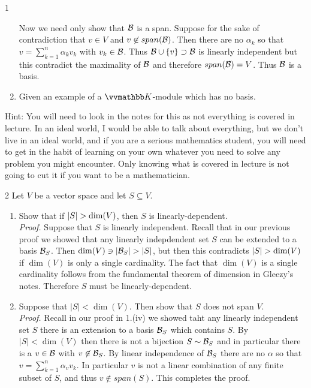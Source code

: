 \documentclass{exercises}
\begin{document}
\begin{exr}{}{1}
\begin{enumerate}
			Now we need only show that $\scriptb$ is a span. Suppose for the sake of contradiction that $v \in V$ and $v \not \in span(\scriptb)$. Then there are no $\alpha_k$ so that $v = \sum_{k=1}^n \alpha_k v_k$ with $v_k \in \scriptb$. Thus $\scriptb \cup \{v\} \supset \scriptb$ is linearly independent but this contradict the maximality of $\scriptb$ and therefore $span(\scriptb) = V$. Thus $\scriptb$ is a basis.

		\item Given an example of a $\K$-module which has no basis.
	\end{enumerate}
	\begin{rmk}
		Hint:  You will need to look in the notes for this as not everything is covered in lecture.  In an ideal world, I would be able to talk about everything, but we don't live in an ideal world, and if you are a serious mathematics student, you will need to get in the habit of learning on your own whatever you need to solve any problem you might encounter.  Only knowing what is covered in lecture is not going to cut it if you want to be a mathematician.
	\end{rmk}
\end{exr}



\begin{exr}{}{2}
	Let $V$ be a vector space and let $S\subseteq V$.
	\begin{enumerate}
		\item Show that if $\lvert S\rvert>\dim (V)$, then $S$ is linearly-dependent.\\

		\emph{Proof.} Suppose that $S$ is linearly independent. Recall that in our previous proof we showed that  any linearly indepdendent set $S$ can be extended to a basis $\scriptb_S$. Then $\dim(V) \ni |\scriptb_S| > |S|$, but then this contradicts $\lvert S\rvert > \dim(V)$ if $\dim(V)$ is only a single cardinality. The fact that $\dim(V)$ is a single cardinality follows from the fundamental theorem of dimension in Gleezy's notes. Therefore $S$ must be linearly-dependent.

		\item Suppose that $|S| < \dim (V)$. Then show that $S$ does not span $V$.\\

		\emph{Proof.} Recall in our proof in 1.(iv) we showed taht any linearly independent set $S$ there is an extension to a basis $\scriptb_S$ which contains $S$. By $|S| < \dim (V)$ then there is not a bijection $S \sim \scriptb_S$ and in particular there is a $v \in \scriptb$ with $v \not \in \scriptb_S$. By linear independence of $\scriptb_S$ there are no $\alpha$ so that $v = \sum_{k=1}^n{\alpha_v v_k}$. In particular $v$ is not a linear combination of any finite subset of $S$, and thus $v \not \in span(S)$. This completes the proof. 
		
	\end{enumerate}
\end{exr}
\end{document}
